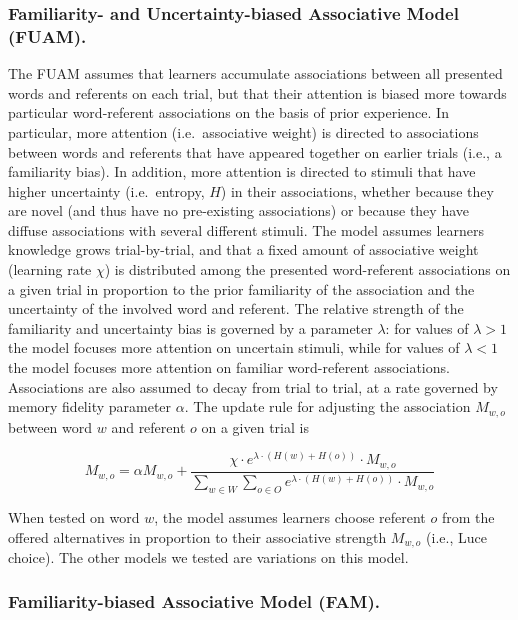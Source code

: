 \documentclass[10pt, letterpaper]{article}
\begin{document}
\subsubsection{Familiarity- and Uncertainty-biased Associative Model
(FUAM).}\label{familiarity--and-uncertainty-biased-associative-model-fuam.}

The FUAM assumes that learners accumulate associations between all
presented words and referents on each trial, but that their attention is
biased more towards particular word-referent associations on the basis
of prior experience. In particular, more attention (i.e.~associative
weight) is directed to associations between words and referents that
have appeared together on earlier trials (i.e., a familiarity bias). In
addition, more attention is directed to stimuli that have higher
uncertainty (i.e.~entropy, \(H\)) in their associations, whether because
they are novel (and thus have no pre-existing associations) or because
they have diffuse associations with several different stimuli. The model
assumes learners knowledge grows trial-by-trial, and that a fixed amount
of associative weight (learning rate \(\chi\)) is distributed among the
presented word-referent associations on a given trial in proportion to
the prior familiarity of the association and the uncertainty of the
involved word and referent. The relative strength of the familiarity and
uncertainty bias is governed by a parameter \(\lambda\): for values of
\(\lambda>1\) the model focuses more attention on uncertain stimuli,
while for values of \(\lambda<1\) the model focuses more attention on
familiar word-referent associations. Associations are also assumed to
decay from trial to trial, at a rate governed by memory fidelity
parameter \(\alpha\). The update rule for adjusting the association
\(M_{w,o}\) between word \(w\) and referent \(o\) on a given trial is

\begin{equation}
M_{w,o} =  \alpha M_{w,o} + \frac{ \chi \cdot e^{ \lambda \cdot (H(w) + H(o)) } \cdot M_{w,o}  }{  \sum_{w\in W} \sum_{o\in O} e^{ \lambda \cdot (H(w) + H(o)) } \cdot M_{w,o} }
\label{eq:fullmodel}
\end{equation}

When tested on word \(w\), the model assumes learners choose referent
\(o\) from the offered alternatives in proportion to their associative
strength \(M_{w,o}\) (i.e., Luce choice). The other models we tested are
variations on this model.

\subsubsection{Familiarity-biased Associative Model
(FAM).}\label{familiarity-biased-associative-model-fam.}
\end{document}
